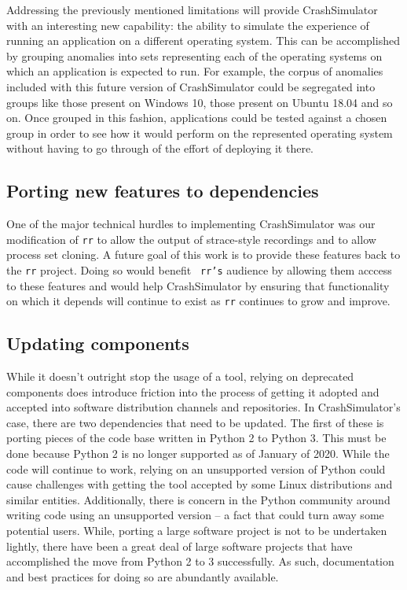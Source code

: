 \documentclass[twocolumn]{article}
\begin{document}
Addressing the previously mentioned limitations will provide CrashSimulator
with an interesting new capability: the ability to simulate the experience
of running an application on a different operating system.  This can be
accomplished by grouping anomalies into sets representing each of the
operating systems on which an application is expected to run. For example,
the corpus of anomalies included with this future version of CrashSimulator
could be segregated into groups like those present on Windows 10, those
present on Ubuntu 18.04 and so on.  Once grouped in this fashion,
applications could be tested against a chosen group in order to see how it
would perform on the represented operating system without having to go
through of the effort of deploying it there.


\subsection{Porting new features to dependencies}

One of the major technical hurdles to implementing CrashSimulator was our
modification of {\tt rr} to allow the output of strace-style recordings and
to allow process set cloning.  A future goal of this work is to provide
these features back to the {\tt rr} project.  Doing so would benefit {\tt
rr's} audience by allowing them acccess to these features
and would help CrashSimulator by ensuring that functionality on which it
depends will continue to exist as {\tt rr} continues to grow and improve.


\subsection{Updating components}

While it doesn't outright stop the usage of a tool, relying on deprecated
components does introduce friction into the process of getting it adopted
and accepted into software distribution channels and repositories.  In
CrashSimulator's case, there are two dependencies that need to be updated.
The first of these is porting pieces of the code base written in Python 2
to Python 3.  This must be done because Python 2 is no longer supported as
of January of 2020.  While the code will continue to work, relying on an
unsupported version of Python could cause challenges with getting the tool
accepted by some Linux distributions and similar entities.  Additionally,
there is concern in the Python community around writing code using an
unsupported version -- a fact that could turn away some potential users.
While, porting a large software project is not to be undertaken lightly,
there have been a great deal of large software projects that have
accomplished the move from Python 2 to 3 successfully.  As such,
documentation and best practices for doing so are abundantly available.
\end{document}
